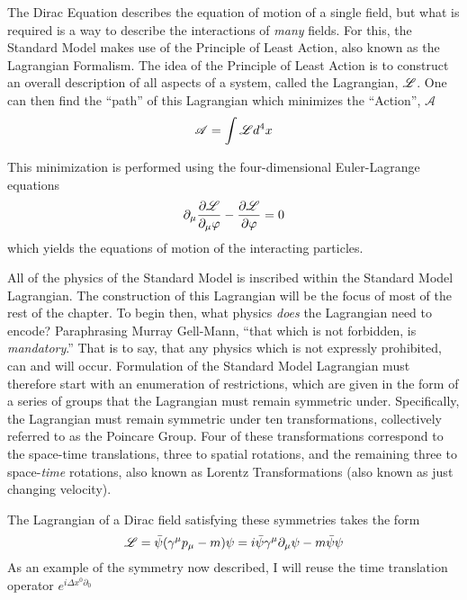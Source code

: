     The Dirac Equation describes the equation of motion of a single field,
        but what is required is a way to describe the interactions of \textit{many} fields.
    For this, the Standard Model makes use of the Principle of Least Action,
        also known as the Lagrangian Formalism\cite{Halzen_book}.
    The idea of the Principle of Least Action is to construct an overall description of all aspects of a system,
        called the Lagrangian, $\mathscr{L}$.
    One can then find the ``path'' of this Lagrangian which minimizes the ``Action'', $\mathscr{A}$
    \begin{equation} %
        \mathscr{A} = \int \Lag d^4 x
    \end{equation}

    This minimization is performed using the four-dimensional Euler-Lagrange equations
    \begin{equation}
        \partial_\mu \frac{\partial \mathscr{L}}{\partial_\mu \varphi } - \frac{\partial \mathscr{L}}{\partial \varphi} = 0
    \end{equation}
    which yields the equations of motion of the interacting particles.

    All of the physics of the Standard Model is inscribed within the Standard Model Lagrangian.
    The construction of this Lagrangian will be the focus of most of the rest of the chapter.
    To begin then, what physics \textit{does} the Lagrangian need to encode?
    Paraphrasing Murray Gell-Mann, ``that which is not forbidden, is \textit{mandatory}.''
    That is to say, that any physics which is not expressly prohibited, can and will occur.
    Formulation of the Standard Model Lagrangian must therefore start with an enumeration of restrictions,
        which are given in the form of a series of groups that the Lagrangian must remain symmetric under.
    Specifically, the Lagrangian must remain symmetric under ten transformations,
        collectively referred to as the Poincare Group.
    Four of these transformations correspond to the space-time translations,
        three to spatial rotations, and the remaining three to space-\textit{time} rotations,
        also known as Lorentz Transformations (also known as just changing velocity).

    The Lagrangian of a Dirac field satisfying these symmetries takes the form
    \begin{equation} \label{eq:basic_fermionL}
        \mathscr{L} = \bar{\psi} (\gamma^\mu p_\mu - m) \psi = i \bar{\psi} \gamma^\mu \partial_\mu \psi - m \bar{\psi} \psi
    \end{equation}
    As an example of the symmetry now described, I will reuse the time translation operator $e^{i\Delta x^0 \partial_0}$

